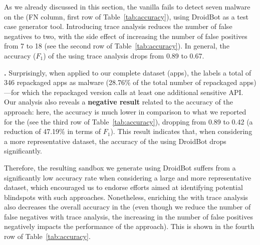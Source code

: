 As we already discussed in this section, the vanilla \mas fails
to detect seven malware on the \sds (FN column, first row of Table~\ref{tab:accuracy}),
using DroidBot as a test case generator tool. Introducing trace analysis reduces the
number of false negatives to two, with the side effect of increasing the
number of false positives from 7 to 18 (see the second row of Table~\ref{tab:accuracy}).
In general, the accuracy ($F_1$) of the \mas using trace analysis drops from 0.89 to 0.67.





{\bf \cds.} Surprisingly, when applied to our complete dataset (\apps apps), the \mas
labels a total of 346 repackaged apps as malware (28.76\% of the total number of repackaged
apps)---for which the repackaged version calls at least one additional sensitive API.
Our analysis also reveals a {\bf negative result} related to the accuracy of the approach: here,
the accuracy is much lower in comparison to what we reported for the
\sds (see the third row of Table~\ref{tab:accuracy}), dropping from 0.89 to 0.42 (a reduction of 47.19\% in terms of $F_1$).
This result indicates that, when considering a more representative dataset, the accuracy of the \mas using
DroidBot drops significantly. 




Therefore, the resulting sandbox we generate using
DroidBot suffers from a significantly low accuracy rate when considering a large and more representative dataset, 
which encouraged us to endorse efforts aimed at identifying potential blindspots with such approaches.
Nonetheless, enriching the \mas with trace analysis also
decreases the overall accuracy in the \cds (even though we reduce the
number of false negatives with trace analysis, the increasing in the
number of false positives negatively impacts the performance of the
approach). This is shown in the fourth row of Table~\ref{tab:accuracy}.


